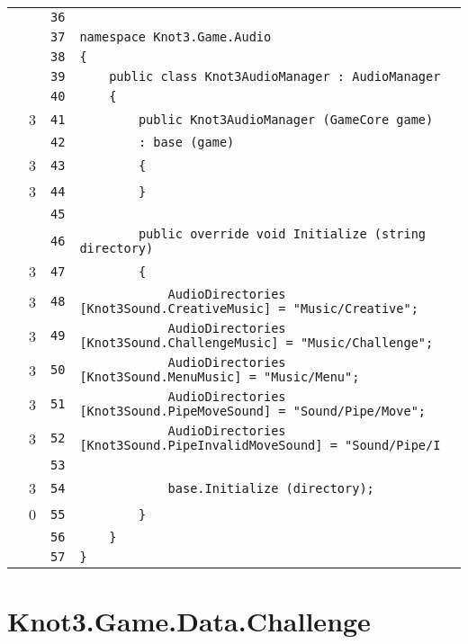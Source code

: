 \documentclass[a4paper,10pt]{article}
\begin{document}
\begin{longtable}[l]{lrrl}
\cellcolor{gray} &  & \verb~36~ & \verb~~\\
\cellcolor{gray} &  & \verb~37~ & \verb~namespace Knot3.Game.Audio~\\
\cellcolor{gray} &  & \verb~38~ & \verb~{~\\
\cellcolor{gray} &  & \verb~39~ & \verb~    public class Knot3AudioManager : AudioManager~\\
\cellcolor{gray} &  & \verb~40~ & \verb~    {~\\
\cellcolor{green} & 3 & \verb~41~ & \verb~        public Knot3AudioManager (GameCore game)~\\
\cellcolor{gray} &  & \verb~42~ & \verb~        : base (game)~\\
\cellcolor{green} & 3 & \verb~43~ & \verb~        {~\\
\cellcolor{green} & 3 & \verb~44~ & \verb~        }~\\
\cellcolor{gray} &  & \verb~45~ & \verb~~\\
\cellcolor{gray} &  & \verb~46~ & \verb~        public override void Initialize (string directory)~\\
\cellcolor{green} & 3 & \verb~47~ & \verb~        {~\\
\cellcolor{green} & 3 & \verb~48~ & \verb~            AudioDirectories [Knot3Sound.CreativeMusic] = "Music/Creative";~\\
\cellcolor{green} & 3 & \verb~49~ & \verb~            AudioDirectories [Knot3Sound.ChallengeMusic] = "Music/Challenge";~\\
\cellcolor{green} & 3 & \verb~50~ & \verb~            AudioDirectories [Knot3Sound.MenuMusic] = "Music/Menu";~\\
\cellcolor{green} & 3 & \verb~51~ & \verb~            AudioDirectories [Knot3Sound.PipeMoveSound] = "Sound/Pipe/Move";~\\
\cellcolor{green} & 3 & \verb~52~ & \verb~            AudioDirectories [Knot3Sound.PipeInvalidMoveSound] = "Sound/Pipe/I~\\
\cellcolor{gray} &  & \verb~53~ & \verb~~\\
\cellcolor{green} & 3 & \verb~54~ & \verb~            base.Initialize (directory);~\\
\cellcolor{red} & 0 & \verb~55~ & \verb~        }~\\
\cellcolor{gray} &  & \verb~56~ & \verb~    }~\\
\cellcolor{gray} &  & \verb~57~ & \verb~}~\\
\end{longtable}
\newpage
\section{Knot3.Game.Data.Challenge}
\end{document}
